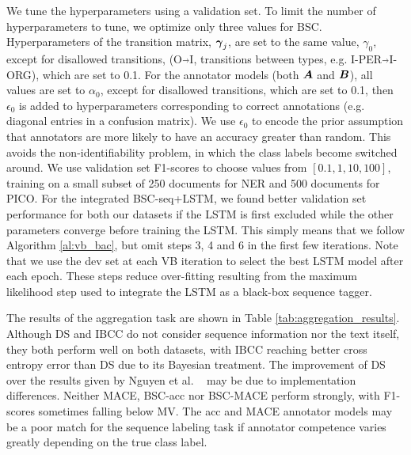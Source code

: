 We tune the hyperparameters using a validation set. To limit the number of hyperparameters to tune, we optimize only three values for BSC.
Hyperparameters of the transition matrix, $\boldsymbol\gamma_j$, are set to the same value, 
$\gamma_0$, except for disallowed transitions, (O$\Arrow{0.2cm}$I, transitions between types, e.g. I-PER$\Arrow{0.2cm}$I-ORG), which are set to 0.1.  
For the annotator models (both $\boldsymbol A$ and $\boldsymbol B$),
all values are set to $\alpha_0$, except for disallowed transitions, which are set to 0.1, then $\epsilon_0$ is added to hyperparameters 
corresponding to correct annotations (e.g. diagonal entries in a confusion matrix).
We use $\epsilon_0$ to encode the prior assumption that annotators are more likely to have an accuracy greater than random. This avoids the non-identifiability problem, in which the class labels become switched around.
We use validation set F1-scores to choose values from $[0.1, 1, 10, 100]$, 
training on a small subset of 250 documents for NER and 500 documents for PICO. 
For the integrated BSC-seq+LSTM,  
we found better validation set performance for both our datasets if the LSTM is first excluded while 
the other parameters converge before training the LSTM. 
This simply means that we follow Algorithm \ref{al:vb_bac}, but omit steps 3, 
4 and 6 in the first few iterations.
Note that we use the dev set at each VB iteration to select the best
LSTM model after each epoch. 
These steps reduce over-fitting resulting from the maximum likelihood step used to integrate the LSTM as a black-box sequence tagger.

The results of the aggregation task are shown in Table \ref{tab:aggregation_results}.
Although DS and IBCC do not consider sequence information nor the text itself, 
they both perform well on both datasets,
with IBCC reaching better cross entropy error than DS due to its Bayesian treatment.
The improvement of DS over the results given 
by Nguyen et al. ~ may be due to implementation differences. 
Neither MACE, BSC-acc nor BSC-MACE perform strongly, with F1-scores sometimes falling below MV. 
The acc and MACE annotator models may be a poor match for the sequence labeling task if annotator
competence varies greatly depending on the true class label.

